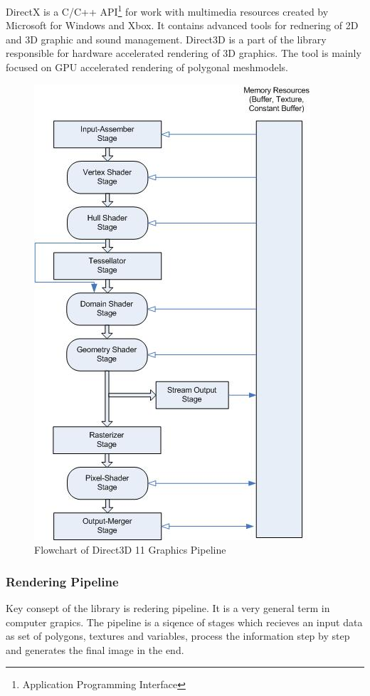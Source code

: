\documentclass[twoside, english, 11pt]{report}
\begin{document}
DirectX is a C/C++ API\footnote{Application Programming Interface} for work with multimedia resources created by Microsoft for Windows and Xbox. It contains advanced tools for rednering of 2D and 3D graphic and sound management. Direct3D is a part of the library responsible for hardware accelerated rendering of 3D graphics. The tool is mainly focused on GPU accelerated rendering of polygonal meshmodels.\\
 \begin{figure}[!h]
\centerline{\includegraphics[scale=0.9]{img/pipeline}}
\caption{Flowchart of Direct3D 11 Graphics Pipeline\label{fig:pipeline}}
\end{figure}
\subsubsection{Rendering Pipeline}
Key consept of the library is redering pipeline. It is a very general term in computer grapics. The pipeline is a siqence of stages which recieves an input data as set of polygons, textures and variables, process the information step by step and generates the final image in the end.\\
\end{document}
